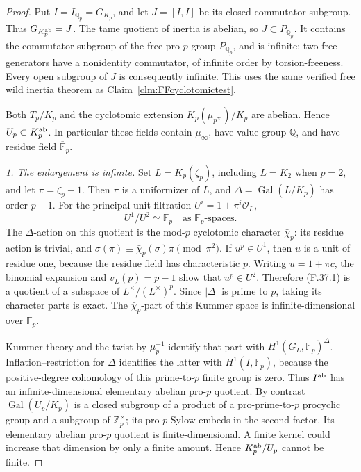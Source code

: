 \documentclass[11pt]{article}
\begin{document}
\begin{proof}
Put \(I=I_{\mathbb Q_p}=G_{K_p}\), and
let \(J=\overline{[I,I]}\) be its closed
commutator subgroup. Thus
\(G_{K_p^{\rm ab}}=J\).
The tame quotient of inertia is abelian,
so \(J\subset P_{\mathbb Q_p}\).
It contains the commutator subgroup of
the free pro-\(p\) group
\(P_{\mathbb Q_p}\), and is infinite:
two free generators have a nonidentity
commutator, of infinite order by
torsion-freeness. Every open subgroup
of \(J\) is consequently infinite.
This uses the same verified free wild
inertia theorem as Claim~\ref{clm:FFcyclotomictest}.

Both \(T_p/K_p\) and the cyclotomic
extension \(K_p(\mu_{p^\infty})/K_p\)
are abelian. Hence \(U_p\subset K_p^{\rm ab}\).
In particular these fields contain
\(\mu_\infty\), have value group
\(\mathbb Q\), and have residue field
\(\overline{\mathbb F}_p\).

\emph{1. The enlargement is infinite.}
Set \(L=K_p(\zeta_p)\), including
\(L=K_2\) when \(p=2\), and let
\(\pi=\zeta_p-1\). Then \(\pi\) is
a uniformizer of \(L\), and
\(\Delta=\operatorname{Gal}(L/K_p)\)
has order \(p-1\). For the principal
unit filtration \(U^i=1+\pi^i\mathcal O_L\),
\[
                    U^1/U^2\simeq
                 \overline{\mathbb F}_p
                \quad\text{as }\mathbb F_p\text{-spaces}.
                                                        \tag{F.37.1}
\]
The \(\Delta\)-action on this quotient
is the mod-\(p\) cyclotomic character
\(\bar\chi_p\): its residue action is
trivial, and
\(\sigma(\pi)\equiv\bar\chi_p(\sigma)\pi
\pmod{\pi^2}\).
If \(u^p\in U^1\), then \(u\) is a
unit of residue one, because the residue
field has characteristic \(p\). Writing
\(u=1+\pi c\), the binomial expansion
and \(v_L(p)=p-1\) show that
\(u^p\in U^2\). Therefore (F.37.1)
is a quotient of a subspace of
\(L^\times/(L^\times)^p\).
Since \(|\Delta|\) is prime to \(p\),
taking its character parts is exact.
The \(\bar\chi_p\)-part of this Kummer
space is infinite-dimensional over
\(\mathbb F_p\).

Kummer theory and the twist by
\(\mu_p^{-1}\) identify that part
with \(H^1(G_L,\mathbb F_p)^\Delta\).
Inflation--restriction for \(\Delta\)
identifies the latter with
\(H^1(I,\mathbb F_p)\), because
the positive-degree cohomology of this
prime-to-\(p\) finite group is zero.
Thus \(I^{\rm ab}\) has an
infinite-dimensional elementary abelian
pro-\(p\) quotient. By contrast
\(\operatorname{Gal}(U_p/K_p)\)
is a closed subgroup of a product
of a pro-prime-to-\(p\) procyclic
group and a subgroup of
\(\mathbb Z_p^\times\); its pro-\(p\)
Sylow embeds in the second factor.
Its elementary abelian pro-\(p\)
quotient is finite-dimensional.
A finite kernel could increase that
dimension by only a finite amount.
Hence \(K_p^{\rm ab}/U_p\) cannot be finite.


\end{proof}
\end{document}
